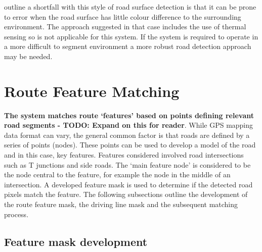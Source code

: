 \documentclass[]{aiaa-tc}%
\begin{document}


\citet{histBackRefineShadows} outline a shortfall with this style of road surface detection is that it can be prone to error when the road surface has little colour difference to the surrounding environment. The approach suggested in that case includes the use of thermal sensing so is not applicable for this system. If the system is required to operate in a more difficult to segment environment a more robust road detection approach may be needed. 


\section{Route Feature Matching}\label{sect:route_feature_matching}

\textbf{The system matches route `features' based on points defining relevant road segments - TODO: Expand on this for reader}. While GPS mapping data format can vary, the general common factor is that roads are defined by a series of points (nodes). These points can be used to develop a model of the road and in this case, key features. Features considered involved road intersections such as T junctions and side roads. The `main feature node' is considered to be the node central to the feature, for example the node in the middle of an intersection. A developed feature mask is used to determine if the detected road pixels match the feature. The following subsections outline the development of the route feature mask, the driving line mask and the subsequent matching process.

\subsection{Feature mask development} \label{s:maskDevelopment}
\end{document}
